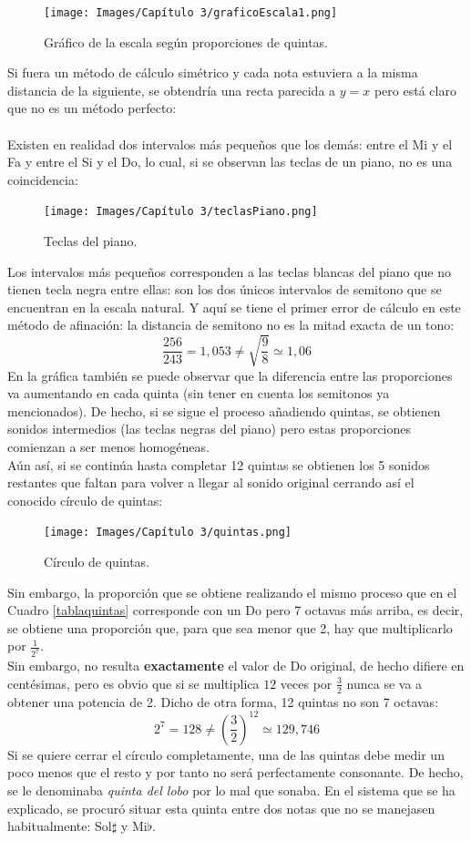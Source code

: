 \documentclass[a4paper, openright, 11pt, titlepage]{report}
\theoremstyle{definition}\newtheorem{defin}[propo]{Definition}
\theoremstyle{definition}\newtheorem{obser}[propo]{Remark}
\theoremstyle{definition}\newtheorem{ejem}[propo]{Ejemplo}
\theoremstyle{definition}\newtheorem{algoritmo}[propo]{Algoritmo}
\begin{document}
\begin{figure}[H]
    \centering
    \texttt{[image: Images/Capítulo 3/graficoEscala1.png]}
    \caption{Gráfico de la escala según proporciones de quintas.}
\end{figure}
Si fuera un método de cálculo simétrico y cada nota estuviera a la misma distancia de la siguiente, se obtendría una recta parecida a $y = x$ pero está claro que no es un método perfecto:\\\\
Existen en realidad dos intervalos más pequeños que los demás: entre el Mi y el Fa y entre el Si y el Do, lo cual, si se observan las teclas de un piano, no es una coincidencia:
\begin{figure}[H]
    \centering
    \texttt{[image: Images/Capítulo 3/teclasPiano.png]}
    \caption{Teclas del piano.}
\end{figure}
Los intervalos más pequeños corresponden a las teclas blancas del piano que no tienen tecla negra entre ellas: son los dos únicos intervalos de semitono que se encuentran en la escala natural. Y aquí se tiene el primer error de cálculo en este método de afinación: la distancia de semitono no es la mitad exacta de un tono: $$\frac{256}{243} = 1,053 \not= \sqrt{\frac{9}{8}} \simeq 1,06$$
En la gráfica también se puede observar que la diferencia entre las proporciones va aumentando en cada quinta (sin tener en cuenta los semitonos ya mencionados). De hecho, si se sigue el proceso añadiendo quintas, se obtienen sonidos intermedios (las teclas negras del piano) pero estas proporciones comienzan a ser menos homogéneas.\\
Aún así, si se continúa hasta completar 12 quintas se obtienen los 5 sonidos restantes que faltan para volver a llegar al sonido original cerrando así el conocido círculo de quintas:
\begin{figure}[H]
    \centering
    \texttt{[image: Images/Capítulo 3/quintas.png]}
    \caption{Círculo de quintas.}
\end{figure}
Sin embargo, la proporción que se obtiene realizando el mismo proceso que en el Cuadro \ref{tablaquintas} corresponde con un Do pero 7 octavas más arriba, es decir, se obtiene una proporción que, para que sea menor que 2, hay que multiplicarlo por $\frac{1}{2^{7}}$.\\
Sin embargo, no resulta \textbf{exactamente} el valor de Do original, de hecho difiere en centésimas, pero es obvio que si se multiplica $12$ veces por $\frac{3}{2}$ nunca se va a obtener una potencia de 2. Dicho de otra forma, 12 quintas no son 7 octavas: $$2^{7} = 128 \not= (\frac{3}{2})^{12} \simeq 129,746$$
Si se quiere cerrar el círculo completamente, una de las quintas debe medir un poco menos que el resto y por tanto no será perfectamente consonante. De hecho, se le denominaba \textit{quinta del lobo} por lo mal que sonaba. En el sistema que se ha explicado, se procuró situar esta quinta entre dos notas que no se manejasen habitualmente: Sol$\sharp$ y Mi$\flat$. 
\end{document}
